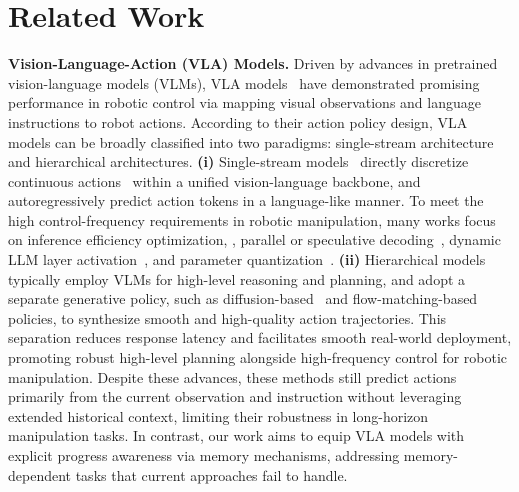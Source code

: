 \section{Related Work}
\label{sec:related}

\noindent\textbf{Vision-Language-Action (VLA) Models.}
Driven by advances in pretrained vision-language models (VLMs), VLA models~\citep{duan2025manipulate,huang2025rekep,black2024pi_0,liu2025hybridvla} have demonstrated promising performance in robotic control via mapping visual observations and language instructions to robot actions.
According to their action policy design, VLA models can be broadly classified into two paradigms: single-stream architecture and hierarchical architectures.
\textbf{(i)} Single-stream models~\citep{zhao2025cot,cen2025worldvla,wang2025unified,lin2025vote} directly discretize continuous actions~\citep{zitkovich2023rt,kim2025openvla} within a unified vision-language backbone, and autoregressively predict action tokens in a language-like manner.
To meet the high control-frequency requirements in robotic manipulation, many works focus on inference efficiency optimization, \eg, parallel or speculative decoding~\citep{wang2025spec,kim2025fine},  dynamic LLM layer activation~\citep{zhang2026mole}, and parameter quantization~\citep{wang2025bitvla}.
\textbf{(ii)} Hierarchical models~\citep{liu2025rdt,wen2025dexvla,wang2025vq} typically employ VLMs for high-level reasoning and planning, and adopt a separate generative policy, such as diffusion-based~\citep{black2024pi_0,li2024cogact} and flow-matching-based~\citep{deng2025graspvla,zhang2025flowpolicy} policies, to synthesize smooth and high-quality action trajectories. 
This separation reduces response latency and facilitates smooth real-world deployment, promoting robust high-level planning alongside high-frequency control for robotic manipulation.
Despite these advances, these methods still predict actions primarily from the current observation and instruction without leveraging extended historical context, limiting their robustness in long-horizon manipulation tasks.
In contrast, our work aims to equip VLA models with explicit progress awareness via memory mechanisms, addressing memory-dependent tasks that current approaches fail to handle.


